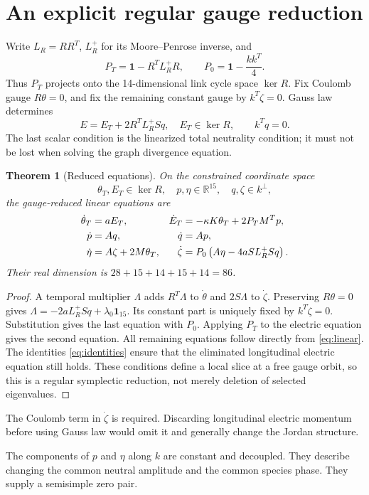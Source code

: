 \documentclass[11pt,a4paper]{article}
\newtheorem{theorem}{Theorem}\newtheorem{proposition}[theorem]{Proposition}\newtheorem{corollary}[theorem]{Corollary}
\newcommand{\id}{\mathbf1}\newcommand{\dd}{\mathrm d}\newcommand{\diag}{\operatorname{diag}}
\begin{document}
\section{An explicit regular gauge reduction}
Write $L_R=RR^T$, $L_R^+$ for its Moore--Penrose inverse, and
\[
P_T=\id-R^TL_R^+R,\qquad P_0=\id-\frac{kk^T}{4}.
\]
Thus $P_T$ projects onto the 14-dimensional link cycle space $\ker R$. Fix Coulomb gauge $R\theta=0$, and fix the remaining constant gauge by $k^T\zeta=0$. Gauss law determines
\begin{equation}
E=E_T+2R^TL_R^+S q,\quad E_T\in\ker R,\qquad k^Tq=0.
\end{equation}
The last scalar condition is the linearized total neutrality condition; it must not be lost when solving the graph divergence equation.

\begin{theorem}[Reduced equations]
On the constrained coordinate space
\[
\theta_T,E_T\in\ker R,\quad p,\eta\in\mathbb R^{15},\quad
q,\zeta\in k^\perp,
\]
the gauge-reduced linear equations are
\begin{align}
\dot\theta_T&=aE_T,&
\dot E_T&=-\kappa K\theta_T+2P_TM^Tp,\notag\\
\dot p&=Aq,&\dot q&=Ap,\label{eq:reduced}\\
\dot\eta&=A\zeta+2M\theta_T,&
\dot\zeta&=P_0\left(A\eta-4aS L_R^+S q\right).\notag
\end{align}
Their real dimension is $28+15+14+15+14=86$.
\end{theorem}
\begin{proof}
A temporal multiplier $\Lambda$ adds $R^T\Lambda$ to $\dot\theta$ and $2S\Lambda$ to $\dot\zeta$. Preserving $R\theta=0$ gives
$\Lambda=-2aL_R^+Sq+\lambda_0\boldsymbol1_{15}$. Its constant part is uniquely fixed by $k^T\dot\zeta=0$. Substitution gives the last equation with $P_0$. Applying $P_T$ to the electric equation gives the second equation. All remaining equations follow directly from \eqref{eq:linear}. The identities \eqref{eq:identities} ensure that the eliminated longitudinal electric equation still holds. These conditions define a local slice at a free gauge orbit, so this is a regular symplectic reduction, not merely deletion of selected eigenvalues.
\end{proof}
The Coulomb term in $\dot\zeta$ is required. Discarding longitudinal electric momentum before using Gauss law would omit it and generally change the Jordan structure.

The components of $p$ and $\eta$ along $k$ are constant and decoupled. They describe changing the common neutral amplitude and the common species phase. They supply a semisimple zero pair.
\end{document}
